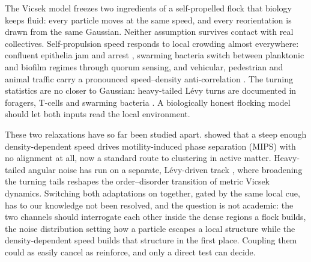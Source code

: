 \documentclass[11pt,a4paper]{article}
\begin{document}
The Vicsek model \citep{Vicsek1995} freezes two ingredients of
a self-propelled flock that biology keeps fluid: every particle
moves at the same speed, and every reorientation is drawn from
the same Gaussian. Neither assumption survives contact with
real collectives. Self-propulsion speed responds to local
crowding almost everywhere: confluent epithelia
jam and arrest \citep{Bi2016}, swarming bacteria switch between
planktonic and biofilm regimes through quorum sensing, and
vehicular, pedestrian and animal traffic carry a pronounced
speed--density anti-correlation \citep{Greenshields, LWR}. The
turning statistics are no closer to Gaussian: heavy-tailed
L\'evy turns are documented in foragers, T-cells and swarming
bacteria \citep{Reynolds2018, Harris2012, Ariel2015}. A
biologically honest flocking model should let both inputs read
the local environment.

These two relaxations have so far been studied apart.
\citet{CatesTailleur2015} showed that a steep enough
density-dependent speed drives motility-induced phase
separation (MIPS) with no alignment at all, now a standard route
to clustering in active matter. Heavy-tailed angular noise has
run on a separate, L\'evy-driven track \citep{Eliazar2003,
Ariel2015}, where broadening the turning tails reshapes the
order--disorder transition of metric Vicsek dynamics. Switching
both adaptations on together, gated by the same local cue, has
to our knowledge not been resolved, and the question is not
academic: the two channels should interrogate each other
inside the dense regions a flock builds, the noise
distribution setting how a particle escapes a local structure
while the density-dependent speed builds that structure in the
first place. Coupling them could as easily cancel as reinforce,
and only a direct test can decide.
\end{document}
